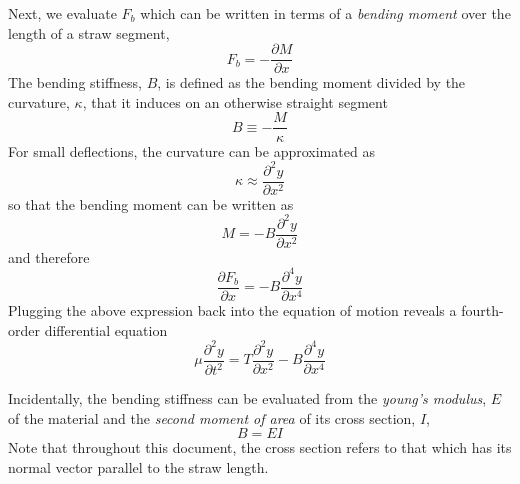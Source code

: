 \documentclass[twoside]{article}
\begin{document}
\begin{multicols}{2}
Next, we evaluate $F_b$ which can be written in terms of a \emph{bending moment} over the length of a straw segment,
\begin{equation}
F_b  = -\frac{\partial M}{\partial x} 
\end{equation}
The bending stiffness, $B$, is defined as the bending moment divided by the curvature, $\kappa$, that it induces on an otherwise straight segment
\begin{equation}
 B \equiv -\frac{M}{\kappa}
\end{equation}
For small deflections, the curvature can be approximated as
\begin{equation}
\kappa \approx \frac{\partial^2y}{\partial x^2}
\end{equation}
so that the bending moment can be written as
\begin{equation}
M = - B \frac{\partial^2y}{\partial x^2}
\end{equation}
and therefore
\begin{equation}
	\frac{\partial F_b}{\partial x} =  -B \frac{\partial^4y}{\partial x^4}
\end{equation}
Plugging the above expression back into the equation of motion reveals a fourth-order differential equation
\begin{equation}
\boxed{
\mu \frac{\partial^2y}{\partial t^2} = T \frac{\partial^2y}{\partial x^2} - B \frac{\partial^4y}{\partial x^4}
\label{eq:it}
}
\end{equation}

Incidentally, the bending stiffness can be evaluated from the \emph{young's modulus}, $E$ of the material and the \emph{second moment of area} of its cross section, $I$,
\begin{equation}
B = E I
\end{equation}
Note that throughout this document, the cross section refers to that which has its normal vector parallel to the straw length.





\end{multicols}
\end{document}
